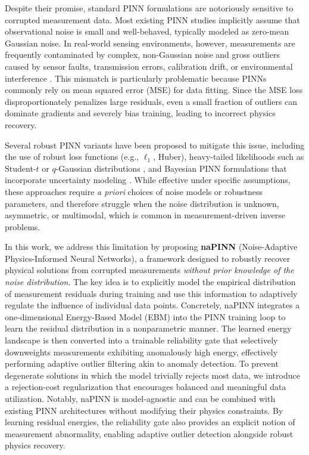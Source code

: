 \documentclass{article}
\theoremstyle{plain}
\theoremstyle{definition}
\theoremstyle{remark}
\begin{document}
Despite their promise, standard PINN formulations are notoriously sensitive to corrupted measurement data. Most existing PINN studies implicitly assume that observational noise is small and well-behaved, typically modeled as zero-mean Gaussian noise. In real-world sensing environments, however, measurements are frequently contaminated by complex, non-Gaussian noise and gross outliers caused by sensor faults, transmission errors, calibration drift, or environmental interference \cite{Chander2022}. This mismatch is particularly problematic because PINNs commonly rely on mean squared error (MSE) for data fitting. Since the MSE loss disproportionately penalizes large residuals, even a small fraction of outliers can dominate gradients and severely bias training, leading to incorrect physics recovery.

Several robust PINN variants have been proposed to mitigate this issue, including the use of robust loss functions (e.g., $\ell_1$, Huber), heavy-tailed likelihoods such as Student-$t$ or $q$-Gaussian distributions \cite{Peng2022, Duarte2025}, and Bayesian PINN formulations that incorporate uncertainty modeling \cite{Yang2021}. While effective under specific assumptions, these approaches require \emph{a priori} choices of noise models or robustness parameters, and therefore struggle when the noise distribution is unknown, asymmetric, or multimodal, which is common in measurement-driven inverse problems.

In this work, we address this limitation by proposing \textbf{naPINN} (Noise-Adaptive Physics-Informed Neural Networks), a framework designed to robustly recover physical solutions from corrupted measurements \emph{without prior knowledge of the noise distribution}. The key idea is to explicitly model the empirical distribution of measurement residuals during training and use this information to adaptively regulate the influence of individual data points. Concretely, naPINN integrates a one-dimensional Energy-Based Model (EBM) \cite{LeCun2006} into the PINN training loop to learn the residual distribution in a nonparametric manner. The learned energy landscape is then converted into a trainable reliability gate that selectively downweights measurements exhibiting anomalously high energy, effectively performing adaptive outlier filtering akin to anomaly detection. To prevent degenerate solutions in which the model trivially rejects most data, we introduce a rejection-cost regularization that encourages balanced and meaningful data utilization. Notably, naPINN is model-agnostic and can be combined with existing PINN architectures without modifying their physics constraints. By learning residual energies, the reliability gate also provides an explicit notion of measurement abnormality, enabling adaptive outlier detection alongside robust physics recovery.
\end{document}
